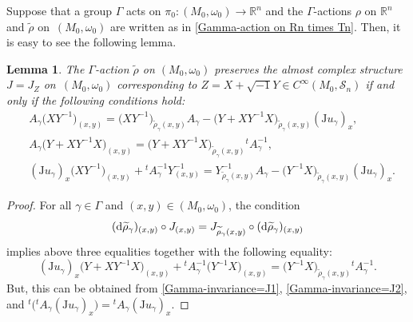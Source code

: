 \documentclass[10pt,a4paper]{amsart}
\numberwithin{equation}{section}
\newtheorem{Lemma}[Theorem]{Lemma}
\newcommand{\R}{\mathbb{R}}
\renewcommand{\tilde}{\widetilde}
\def\J{\mathrm{J}}
\begin{document}
Suppose that a group $\Gamma$ acts on $\pi_0\colon (M_0,\omega_0)\to \R^n$ and the $\Gamma$-actions $\rho$ on $\R^n$ and $\tilde \rho$ on~$(M_0,\omega_0)$ are written as in \eqref{Gamma-action on Rn times Tn}. Then, it is easy to see the following lemma.
\begin{Lemma}
The $\Gamma$-action ${\tilde \rho}$ on $(M_0,\omega_0)$ preserves the almost complex structure $J=J_Z$ on~$(M_0,\omega_0)$ corresponding to $Z=X+\sqrt{-1}Y\in C^\infty ( M_0,{\mathcal S}_n)$ if and only if the following conditions hold:
\begin{align}
& A_\gamma\bigl(XY^{-1}\bigr)_{(x,y)}=\bigl(XY^{-1}\bigr)_{{\tilde \rho}_\gamma (x,y)}A_\gamma-\bigl(Y+XY^{-1}X\bigr)_{{\tilde \rho}_\gamma (x,y)}(\J u_\gamma)_x , \label{Gamma-invariance=J1}\\
& A_\gamma\bigl(Y+XY^{-1}X\bigr)_{(x,y)}=\bigl(Y+XY^{-1}X\bigr)_{{\tilde \rho}_\gamma (x,y)} {}^tA_\gamma^{-1},\label{Gamma-invariance=J2} \\
& (\J u_\gamma)_x\bigl(XY^{-1}\bigr)_{(x,y)}+{}^tA_\gamma^{-1}Y^{-1}_{(x,y)}=Y^{-1}_{{\tilde \rho}_\gamma (x,y)}A_\gamma -\bigl(Y^{-1}X\bigr)_{{\tilde \rho}_\gamma (x,y)}(\J u_\gamma)_x.\nonumber
\end{align}
\end{Lemma}
\begin{proof}
For all $\gamma \in \Gamma$ and $(x,y)\in (M_0,\omega_0)$, the condition
\[
({\rm d}{\tilde \rho}_\gamma)_{(x,y)}\circ J_{(x,y)}=J_{{\tilde \rho}_\gamma (x,y)}\circ ({\rm d}{\tilde \rho}_\gamma)_{(x,y)}
\]
 implies above three equalities together with the following equality:
\[
(\J u_\gamma)_x\bigl(Y+XY^{-1}X\bigr)_{(x,y)}+{}^tA_\gamma^{-1}\bigl(Y^{-1}X\bigr)_{(x,y)}=\bigl(Y^{-1}X\bigr)_{{\tilde \rho}_\gamma (x,y)}{}^tA_\gamma^{-1}.
\]
But, this can be obtained from \eqref{Gamma-invariance=J1}, \eqref{Gamma-invariance=J2}, and ${}^t\bigl({}^tA_\gamma (\J u_\gamma)_x\bigr)={}^tA_\gamma (\J u_\gamma)_x$.
\end{proof}
\end{document}
